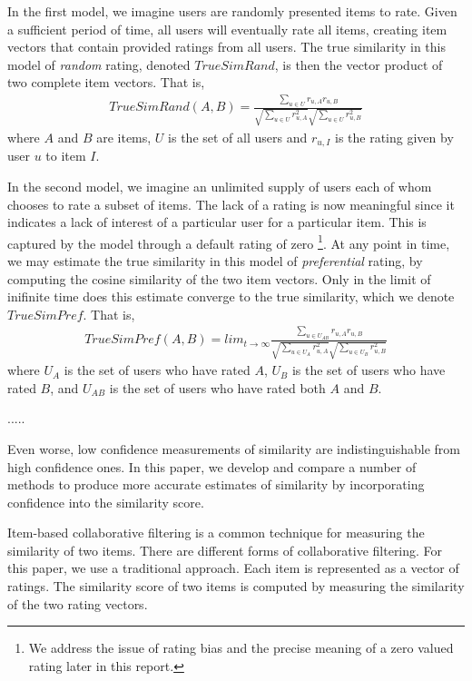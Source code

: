 \documentclass[11pt]{article}
\begin{document}
In the first model, we imagine users are randomly presented items to rate. Given 
a sufficient period of time, all users will eventually rate all items, creating
item vectors that contain provided ratings from all users. The true similarity 
in this model of {\em random} rating, denoted $TrueSimRand$, is then the vector 
product of two complete item vectors. That is, 
\begin{align}
TrueSimRand(A, B) = \frac{\sum\limits_{u\in U}
r_{u,A}r_{u,B}}{\sqrt{\sum\limits_{u\in U} r_{u,A}^2}
\sqrt{\sum\limits_{u\in U} r_{u,B}^2}}
\end{align}
where $A$ and $B$ are items, $U$ is the set of all users and $r_{u,I}$ is the 
rating given by user $u$ to item $I$.

In the second model, we imagine an unlimited supply of users each of whom
chooses to rate a subset of items. The lack of a rating is now meaningful since
it indicates a lack of interest of a particular user for a particular item. This
is captured by the model through a default rating of zero \footnote{We address
the issue of rating bias and the precise meaning of a zero valued rating later
in this report.}. At any point in time, we may estimate the true similarity in
this model of {\em preferential} rating, by computing the cosine similarity of
the two item vectors. Only in the limit of inifinite time does this estimate
converge to the true similarity, which we denote $TrueSimPref$.  That is,
\begin{align}
TrueSimPref(A, B) = lim_{t\to\infty}\frac{\sum\limits_{u\in U_{AB}}
r_{u,A}r_{u,B}}{\sqrt{\sum\limits_{u\in U_A} r_{u,A}^2}
\sqrt{\sum\limits_{u\in U_B} r_{u,B}^2}}
\end{align}
where $U_A$ is the set of users who have rated $A$, $U_B$ is the set of users
who have rated $B$, and $U_{AB}$ is the set of users who have rated both $A$ and
$B$.

.....

Even worse, low confidence measurements of similarity are indistinguishable from
high confidence ones. In this paper, we develop and compare a number of methods
to produce more accurate estimates of similarity by incorporating confidence
into the similarity score.
 
Item-based collaborative filtering is a common technique for measuring the
similarity of two items. There are different forms of collaborative filtering.
For this paper, we use a traditional approach. Each item is represented as a
vector of ratings. The similarity score of two items is computed by measuring
the similarity of the two rating vectors.
\end{document}
